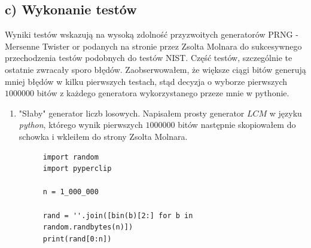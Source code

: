 \documentclass{article}
\begin{document}
\subsection{c) Wykonanie testów}

Wyniki testów wskazują na wysoką zdolność przyzwoitych generatorów PRNG - Mersenne Twister or podanych na stronie przez Zsolta Molnara do sukcesywnego przechodzenia testów podobnych do testów NIST. Część testów, szczególnie te ostatnie zwracały sporo błędów. Zaobserwowałem, że większe ciągi bitów generują mniej błędów w kilku pierwszych testach, stąd decyzja o wyborze pierwszych $1000000$ bitów z każdego generatora wykorzystanego przeze mnie w pythonie.

\newpage

\begin{enumerate}
    \item "Słaby" generator liczb losowych. Napisałem prosty generator $LCM$ w języku \textit{python}, którego wynik pierwszych $1000000$ bitów następnie skopiowałem do schowka i wkleiłem do strony Zsolta Molnara. 
    \begin{figure}[H]
    \centering
    \begin{minipage}{0.6\textwidth}
        \begin{verbatim}
import random
import pyperclip

n = 1_000_000

rand = ''.join([bin(b)[2:] for b in random.randbytes(n)])
print(rand[0:n])


\end{verbatim}
\end{minipage}
\end{figure}
\end{enumerate}
\end{document}
